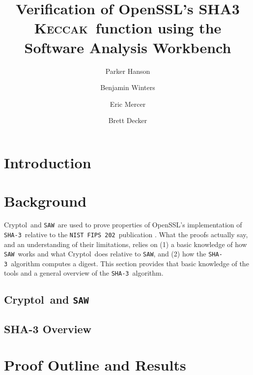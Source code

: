 \documentclass[runningheads]{llncs}
\newcommand{\keccak}{\textsc{Keccak}}
\newcommand{\shaThree}{\texttt{SHA-3}}
\newcommand{\nist}{\texttt{NIST}}
\newcommand{\fips}{\texttt{FIPS 202}}
\newcommand{\saw}{\texttt{SAW}}
\newcommand{\cryptol}{Cryptol}
\newcommand{\openssl}{OpenSSL}
\begin{document}
%
\title{Verification of OpenSSL's SHA3 \keccak\ function using the Software Analysis Workbench}
%
%
\author{
  Parker Hanson \and
  Benjamin Winters \and
  Eric Mercer \and
  Brett Decker
}
%
%
%
\maketitle              %
%
\begin{abstract}

\end{abstract}

\section{Introduction}\label{sec:introduction}


\section{Background}\label{sec:background}
\cryptol\ and \saw\ are used to prove properties of \openssl's implementation of \shaThree\ relative to the \nist\ \fips\ publication \cite{fips202}. 
What the proofs actually say, and an understanding of their limitations, relies on (1) a basic knowledge of how \saw\ works and what \cryptol\ does relative to \saw, and (2) how the \shaThree\ algorithm computes a digest.
This section provides that basic knowledge of the tools and a general overview of the \shaThree\ algorithm.

\subsection{\cryptol\ and \saw}\label{subsec:saw}

\subsection{SHA-3 Overview}\label{subsec:sha3}



\section{Proof Outline and Results}\label{sec:proof}

\end{document}
